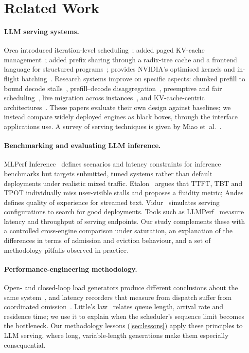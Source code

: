 \section{Related Work}
\label{sec:related}

\paragraph{LLM serving systems.}
Orca introduced iteration-level scheduling~\cite{yu2022orca}; \vllm added paged KV-cache
management~\cite{kwon2023vllm}; \sglang added prefix sharing through a radix-tree cache and a
frontend language for structured programs~\cite{zheng2024sglang}; \trt provides NVIDIA's
optimised kernels and in-flight batching~\cite{trtllm}. Research systems improve on specific
aspects: chunked prefill to bound decode stalls~\cite{agrawal2024sarathi}, prefill--decode
disaggregation~\cite{zhong2024distserve,patel2024splitwise}, preemptive and fair
scheduling~\cite{wu2023fastserve}, live migration across instances~\cite{sun2024llumnix}, and
KV-cache-centric architectures~\cite{qin2025mooncake}. These papers evaluate their own design
against baselines; we instead compare widely deployed engines as black boxes, through the
interface applications use. A survey of serving techniques is given by Miao
et~al.~\cite{miao2023survey}.

\paragraph{Benchmarking and evaluating LLM inference.}
MLPerf Inference~\cite{reddi2020mlperf} defines scenarios and latency constraints for inference
benchmarks but targets submitted, tuned systems rather than default deployments under realistic
mixed traffic. Etalon~\cite{agrawal2024etalon} argues that TTFT, TBT and TPOT individually miss
user-visible stalls and proposes a fluidity metric; Andes~\cite{liu2024andes} defines quality of
experience for streamed text. Vidur~\cite{agrawal2024vidur} simulates serving configurations to
search for good deployments. Tools such as LLMPerf~\cite{llmperf} measure latency and throughput
of serving endpoints. Our study complements these with a controlled cross-engine comparison under
saturation, an explanation of the differences in terms of admission and eviction behaviour, and a
set of methodology pitfalls observed in practice.

\paragraph{Performance-engineering methodology.}
Open- and closed-loop load generators produce different conclusions about the same
system~\cite{schroeder2006open}, and latency recorders that measure from dispatch suffer from
coordinated omission~\cite{tene2015latency}. Little's law~\cite{little1961} relates queue length,
arrival rate and residence time; we use it to explain when the scheduler's sequence limit becomes
the bottleneck. Our methodology lessons (\cref{sec:lessons}) apply these principles to LLM serving,
where long, variable-length generations make them especially consequential.

